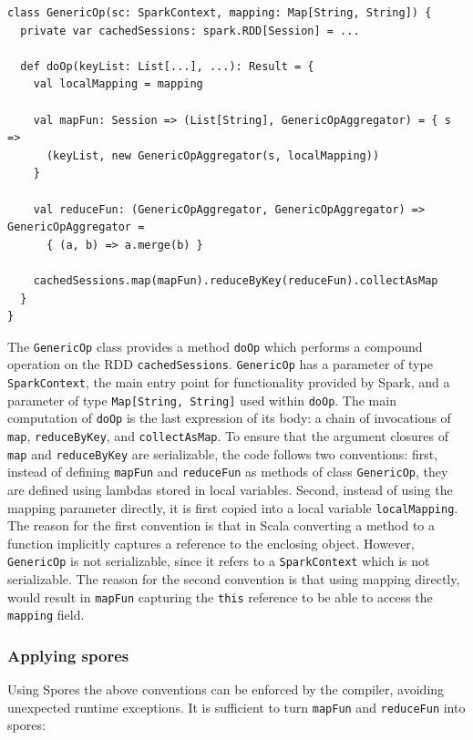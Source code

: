 \documentclass{llncs}
\begin{document}
\begin{lstlisting}
class GenericOp(sc: SparkContext, mapping: Map[String, String]) {
  private var cachedSessions: spark.RDD[Session] = ...

  def doOp(keyList: List[...], ...): Result = {
    val localMapping = mapping

    val mapFun: Session => (List[String], GenericOpAggregator) = { s =>
      (keyList, new GenericOpAggregator(s, localMapping))
    }

    val reduceFun: (GenericOpAggregator, GenericOpAggregator) => GenericOpAggregator =
      { (a, b) => a.merge(b) }

    cachedSessions.map(mapFun).reduceByKey(reduceFun).collectAsMap
  }
}
\end{lstlisting}
\noindent
The \verb|GenericOp| class provides a method \verb|doOp| which performs a compound operation on the RDD \verb|cachedSessions|. \verb|GenericOp| has a parameter of type \verb|SparkContext|, the main entry point for functionality provided by Spark, and a parameter of type \verb|Map[String, String]| used within \verb|doOp|. The main computation of \verb|doOp| is the last expression of its body: a chain of invocations of \verb|map|, \verb|reduceByKey|, and \verb|collectAsMap|. To ensure that the argument closures of \verb|map| and \verb|reduceByKey| are serializable, the code follows two conventions: first, instead of defining \verb|mapFun| and \verb|reduceFun| as methods of class \verb|GenericOp|, they are defined using lambdas stored in local variables. Second, instead of using the mapping parameter directly, it is first copied into a local variable \verb|localMapping|. The reason for the first convention is that in Scala converting a method to a function implicitly captures a reference to the enclosing object. However, \verb|GenericOp| is not serializable, since it refers to a \verb|SparkContext| which is not serializable. The reason for the second convention is that using mapping directly, would result in \verb|mapFun| capturing the \verb|this| reference to be able to access the \verb|mapping| field.

\subsubsection{Applying spores}

Using Spores the above conventions can be enforced by the compiler, avoiding unexpected runtime exceptions. It is sufficient to turn \verb|mapFun| and \verb|reduceFun| into spores:
\end{document}
